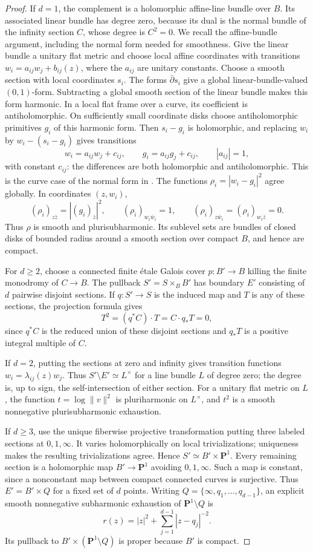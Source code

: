 \documentclass[11pt]{amsart}
\theoremstyle{definition}
\theoremstyle{remark}
\numberwithin{equation}{section}
\newcommand{\PP}{\mathbf P}
\begin{document}
\begin{proof}
If $d=1$, the complement is a holomorphic affine-line bundle over $B$.
Its associated linear bundle has degree zero, because its dual is the
normal bundle of the infinity section $C$, whose degree is $C^2=0$.
We recall the affine-bundle argument, including the normal form needed
for smoothness. Give the linear bundle a unitary flat metric and choose
local affine coordinates with transitions
$w_i=a_{ij}w_j+b_{ij}(z)$, where the $a_{ij}$ are unitary constants.
Choose a smooth section with local coordinates $s_i$. The forms
$\bar\partial s_i$ give a global linear-bundle-valued $(0,1)$-form.
Subtracting a global smooth section of the linear bundle makes this form
harmonic. In a local flat frame over a curve, its coefficient is
antiholomorphic. On sufficiently small coordinate disks choose
antiholomorphic primitives $g_i$ of this harmonic form. Then $s_i-g_i$
is holomorphic, and replacing $w_i$ by $w_i-(s_i-g_i)$ gives transitions
\[
 w_i=a_{ij}w_j+c_{ij},\qquad
 g_i=a_{ij}g_j+c_{ij},\qquad |a_{ij}|=1,
\]
with constant $c_{ij}$: the differences are both holomorphic and
antiholomorphic. This is the curve case of the normal form in
\cite[Proposition~2.1]{KoikeUeda2025}.
The functions $\rho_i=|w_i-g_i|^2$ agree globally. In coordinates $(z,w_i)$,
\[
 (\rho_i)_{z\bar z}=|(g_i)_{\bar z}|^2,\qquad
 (\rho_i)_{w_i\bar w_i}=1,\qquad
 (\rho_i)_{z\bar w_i}=(\rho_i)_{w_i\bar z}=0.
\]
Thus $\rho$ is smooth and plurisubharmonic. Its sublevel sets are bundles
of closed disks of bounded radius around a smooth section over compact
$B$, and hence are compact.

For $d\ge2$, choose a connected finite \'etale Galois cover
$p:B'\to B$ killing the finite monodromy of $C\to B$.
The pullback $S'=S\times_B B'$ has boundary $E'$ consisting of $d$
pairwise disjoint sections. If $q:S'\to S$ is the induced map and $T$
is any of these sections, the projection formula gives
\[
 T^2=(q^*C)\cdot T=C\cdot q_*T=0,
\]
since $q^*C$ is the reduced union of these disjoint sections and $q_*T$
is a positive integral multiple of $C$.

If $d=2$, putting the sections at zero and infinity gives transition
functions $w_i=\lambda_{ij}(z)w_j$. Thus
$S'\setminus E'\simeq L^\times$ for a line bundle $L$ of degree zero;
the degree is, up to sign, the self-intersection of either section.
For a unitary flat metric on $L$, the function
$t=\log\|v\|^2$ is pluriharmonic on $L^\times$, and $t^2$ is a smooth
nonnegative plurisubharmonic exhaustion.

If $d\ge3$, use the unique fiberwise projective transformation putting
three labeled sections at $0,1,\infty$. It varies holomorphically on
local trivializations; uniqueness makes the resulting trivializations
agree. Hence $S'\simeq B'\times\PP^1$. Every remaining section
is a holomorphic map $B'\to\PP^1$ avoiding $0,1,\infty$. Such a
map is constant, since a nonconstant map between compact connected
curves is surjective. Thus $E'=B'\times Q$ for a fixed set of $d$ points.
Writing $Q=\{\infty,q_1,\ldots,q_{d-1}\}$, an explicit smooth
nonnegative subharmonic exhaustion of $\PP^1\setminus Q$ is
\[
 r(z)=|z|^2+\sum_{j=1}^{d-1}|z-q_j|^{-2}.
\]
Its pullback to $B'\times(\PP^1\setminus Q)$ is proper because
$B'$ is compact.


\end{proof}
\end{document}
